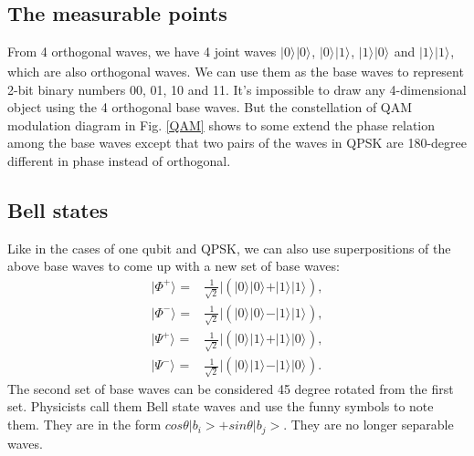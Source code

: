 \documentclass{book}
\newcommand{\keta}[2][]{\vert {#2} \rangle_{#1}}
\begin{document}
\subsection{The measurable points}
From 4 orthogonal waves, we have 4 joint waves $\keta{0}\keta{0}$, $\keta{0}\keta{1}$, $\keta{1}\keta{0}$ and $\keta{1}\keta{1}$, which are also orthogonal waves. We can use them as the base waves to represent 2-bit binary numbers 00, 01, 10 and 11. It's impossible to draw any 4-dimensional object using the 4 orthogonal base waves. But the constellation of QAM modulation diagram in Fig. \ref{QAM} shows to some extend the phase relation among the base waves except that two pairs of the waves in QPSK are 180-degree different in phase instead of orthogonal.


\subsection{Bell states}
Like in the cases of one qubit and QPSK, we can also use superpositions of the above base waves to come up with a new set of base waves:
\begin{equation}
\begin{array}{rl}
    \keta{\Phi^{+}} =& \frac 1 {\sqrt 2}| (\keta{0}\keta{0}+\keta{1}\keta{1}),\\
    \keta{\Phi^{-}} =& \frac 1 {\sqrt 2}| (\keta{0}\keta{0}-\keta{1}\keta{1}),\\
    \keta{\Psi^{+}} =& \frac 1 {\sqrt 2}| (\keta{0}\keta{1}+\keta{1}\keta{0}),\\
    \keta{\Psi^{-}} =& \frac 1 {\sqrt 2}| (\keta{0}\keta{1}-\keta{1}\keta{0}).
\end{array}
\end{equation}
The second set of base waves can be considered 45 degree rotated from the first set. Physicists call them Bell state waves and use the funny symbols to note them. They are in the form $cos\theta |b_i> + sin\theta |b_j>$. They are no longer separable waves.
\end{document}
